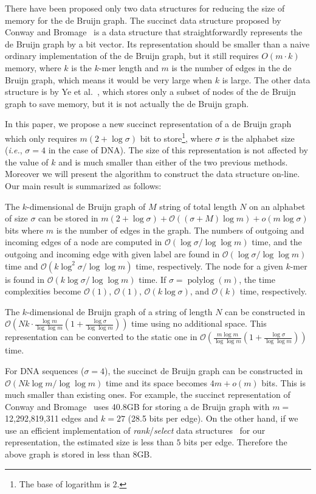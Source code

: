 \documentclass{llncs}
\newcommand{\Order}{\mathcal{O}}
\newcommand{\order}{o}
\def\polylog{{\mathop{\mathrm{polylog}}\nolimits}}
\def\rank{\textit{rank}}
\def\select{\textit{select}}
\begin{document}
There have been proposed only two data structures for
reducing the size of memory for the de Bruijn graph.
The succinct data structure proposed by Conway and Bromage~\cite{ConBro11}
is a data structure that straightforwardly
represents the de Bruijn graph by a bit vector.
Its representation should be smaller than a naive ordinary implementation of
the de Bruijn graph, but it still requires $O(m\cdot k)$ memory,
where $k$ is the $k$-mer length and $m$ is the number of edges in the de Bruijn graph,
which means it would be very large when $k$ is large.
The other data structure is by Ye et al.~\cite{YeMa12}, which
stores only a subset of nodes of the de Bruijn graph to save memory,
but it is not actually the de Bruijn graph.

In this paper, we propose a new succinct representation of a de Bruijn graph
which only requires $m(2+\log \sigma)$ bit to store\footnote{The base of logarithm is $2$.}, where
$\sigma$ is the alphabet size ({\it i.e.}, $\sigma = 4$ in the case of DNA).
The size of this representation is not affected by the value of $k$ and is
much smaller than either of the two previous methods.
Moreover we will present the algorithm to construct the data structure on-line.
Our main result is summarized as follows:
\begin{theorem}
The $k$-dimensional de Bruijn graph of $M$ string of total length $N$ on an alphabet of size $\sigma$
can be stored in $m(2+\log \sigma) + \Order((\sigma+M) \log m) + \order(m \log\sigma)$
bits where $m$ is the number of edges in the graph.  
The numbers of outgoing and incoming edges of a node are computed in $\Order(\log\sigma/\log\log m)$ time,
and the outgoing and incoming edge with given label are found in $\Order(\log\sigma/\log\log m)$ time
and $\Order(k\log^2\sigma/\log\log m)$ time, respectively.
The node for a given $k$-mer is found in $\Order(k\log\sigma/\log\log m)$ time.
If $\sigma = \polylog(m)$, the time complexities become $\Order(1)$, $\Order(1)$, $\Order(k\log\sigma)$,
and $\Order(k)$ time, respectively.
\end{theorem}

\begin{theorem}
The $k$-dimensional de Bruijn graph of a string of length $N$
can be constructed in $\Order\left(Nk \cdot \frac{\log m}{\log \log m}
(1+\frac{\log\sigma}{\log\log m})\right)$ time using no additional space.
This representation can be converted to the static one in 
$\Order\left(\frac{m\log m}{\log \log m}
(1+\frac{\log\sigma}{\log\log m})\right)$ time.
\end{theorem}
For DNA sequences ($\sigma=4$), the succinct de Bruijn graph can be constructed in 
$\Order(Nk \log m/\log\log m)$ time and its space becomes $4m + \order(m)$ bits.
This is much smaller than existing ones.
For example, the succinct representation of Conway and Bromage~\cite{ConBro11}
uses 40.8GB for storing a de Bruijn graph with $m = $ 12,292,819,311 edges
and $k = 27$ (28.5 bits per edge).  
On the other hand, if we use an efficient implementation
of {\rank}/{\select} data structures~\cite{OkaSad07} for our representation,
the estimated size is less than $5$ bits per edge.  
Therefore the above graph is stored in less than 8GB.
\end{document}
